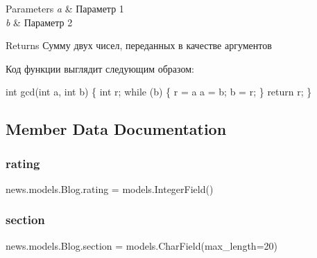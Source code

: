 \begin{DoxyParams}{Parameters}
{\em a} & Параметр 1 \\
\hline
{\em b} & Параметр 2 \\
\hline
\end{DoxyParams}
\begin{DoxyReturn}{Returns}
Сумму двух чисел, переданных в качестве аргументов
\end{DoxyReturn}
Код функции выглядит следующим образом\+: 
\begin{DoxyCode}
    int gcd(int a, int b) \{
int r;
\textcolor{keywordflow}{while} (b) \{
    r = a %
    a = b;
    b = r;
\}
\textcolor{keywordflow}{return} r;
    \}
\end{DoxyCode}
 

\subsection{Member Data Documentation}
\mbox{\label{classnews_1_1models_1_1_blog_a44b6e01f0f7ca6ae9bd23477755efc81}} 
\subsubsection{\texorpdfstring{rating}{rating}}
{\footnotesize\ttfamily news.\+models.\+Blog.\+rating = models.\+Integer\+Field()\hspace{0.3cm}{\ttfamily [static]}}

\mbox{\label{classnews_1_1models_1_1_blog_a0ce1740083f2e95fa0d6709b795a2be3}} 
\subsubsection{\texorpdfstring{section}{section}}
{\footnotesize\ttfamily news.\+models.\+Blog.\+section = models.\+Char\+Field(max\+\_\+length=20)\hspace{0.3cm}{\ttfamily [static]}}

\mbox{\label{classnews_1_1models_1_1_blog_aee461adb8edec4537b75b01175074aba}} 
